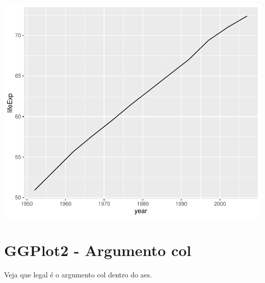 \documentclass[
]{article}
\newenvironment{Shaded}{\begin{snugshade}}{\end{snugshade}}
\newcommand{\DataTypeTok}[1]{\textcolor[rgb]{0.13,0.29,0.53}{#1}}
\newcommand{\KeywordTok}[1]{\textcolor[rgb]{0.13,0.29,0.53}{\textbf{#1}}}
\newcommand{\NormalTok}[1]{#1}
\newcommand{\OperatorTok}[1]{\textcolor[rgb]{0.81,0.36,0.00}{\textbf{#1}}}
\newcommand{\StringTok}[1]{\textcolor[rgb]{0.31,0.60,0.02}{#1}}
\begin{document}
\begin{center}\includegraphics{arquivo_pdf_files/figure-latex/linhas-1} \end{center}

\hypertarget{ggplot2---argumento-col}{%
\section{GGPlot2 - Argumento col}\label{ggplot2---argumento-col}}

Veja que legal é o argumento col dentro do aes.

\begin{Shaded}
\end{Shaded}
\end{document}
